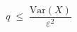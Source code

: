 \documentclass[preview]{standalone}
\begin{document}
\begin{align*}
\boxed{\;\;q \;\leq\; \dfrac{\mathrm{Var}(X)}{\varepsilon^2}\;\;}
\end{align*}
\end{document}
